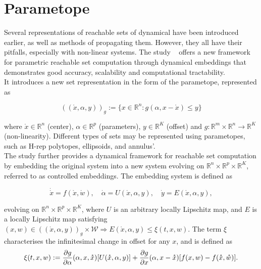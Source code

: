 
%

\chapter{Parametope}
\label{ch:parametope}

Several representations of reachable sets of dynamical have been introduced earlier, as well as methods of propagating them. However, they all have their pitfalls, especially with non-linear systems. The study ~\cite{harapanahalli2025parametric} offers a new framework for parametric reachable set computation through dynamical embeddings that demonstrates good accuracy, scalability and computational tractability. \\

It introduces a new set representation in the form of the parametope, represented as

\begin{equation*}
    ((\mathring{x}, \alpha, y))_g := \{ x \in \mathbb{R}^n : g(\alpha, x-\mathring{x}) \le y \}
\end{equation*}

where $\mathring{x} \in \mathbb{R}^n$ (center), $\alpha \in \mathbb{R}^p$ (parameters), $y \in \mathbb{R}^K$ (offset) and $g : \mathbb{R}^m \times \mathbb{R}^n \rightarrow \mathbb{R}^K$ (non-linearity). Different types of sets may be represented using parametopes, such as H-rep polytopes, ellipsoids, and annulus'. \\

The study further provides a dynamical framework for reachable
set computation by embedding the original system into a new
system evolving on $\mathbb{R}^{n} \times \mathbb{R}^{p} \times \mathbb{R}^{K}$, referred to as controlled embeddings. The embedding system is defined as

\begin{equation*}
    \dot{\mathring{x}} = f(\mathring{x}, \mathring{w}), \quad \dot{\alpha} = U(\mathring{x}, \alpha, y), \quad \dot{y} = E(\mathring{x}, \alpha, y),
\end{equation*}

evolving on $\mathbb{R}^{n} \times \mathbb{R}^{p} \times \mathbb{R}^{K}$, where $U$ is an arbitrary locally Lipschitz map, and $E$ is a locally Lipschitz map satisfying $ (x,w) \in ((\mathring{x}, \alpha, y))_g \times \mathcal{W} \Rightarrow E(\mathring{x}, \alpha, y) \le \xi(t,x,w)$. The term $\xi$ characterises the infinitesimal change in offset for any $x$, and is defined as
\begin{equation*}
    \xi (t,x,w) := \frac{\partial g}{\partial \alpha}(\alpha, x, \mathring{x} ) [ U(\mathring{x}, \alpha, y) ] + \frac{\partial g}{\partial x} (\alpha, x - \mathring{x}) [ f(x,w) - f(\mathring{x}, \mathring{w}) ]. \\
\end{equation*}

